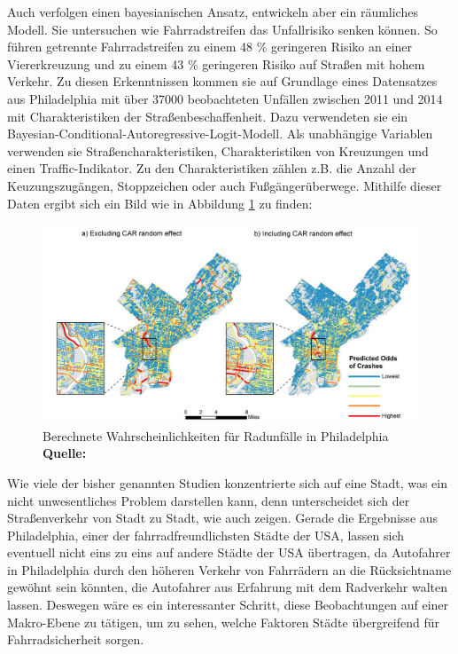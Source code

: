 \documentclass[a4paper,12pt]{thesis}
\newcommand*{\captionsource}[2]{%
	\caption[{#1}]{%
		#1%
		\\\hspace{\linewidth}%
		\textbf{Quelle:} #2%
	}%
}
\begin{document}
Auch \cite{Kondo2018} verfolgen einen bayesianischen Ansatz, entwickeln aber ein räumliches Modell. Sie untersuchen wie Fahrradstreifen das Unfallrisiko senken können. So führen getrennte Fahrradstreifen zu einem 48 \% geringeren Risiko an einer Viererkreuzung und zu einem 43 \% geringeren Risiko auf Straßen mit hohem Verkehr. Zu diesen Erkenntnissen kommen sie auf Grundlage eines Datensatzes aus Philadelphia mit über 37000 beobachteten Unfällen zwischen 2011 und 2014 mit Charakteristiken der Straßenbeschaffenheit. Dazu verwendeten sie ein Bayesian-Conditional-Autoregressive-Logit-Modell. Als unabhängige Variablen verwenden sie Straßencharakteristiken, Charakteristiken von Kreuzungen und einen Traffic-Indikator. Zu den Charakteristiken zählen z.B. die Anzahl der Keuzungszugängen, Stoppzeichen oder auch Fußgängerüberwege. Mithilfe dieser Daten ergibt sich ein Bild wie in Abbildung \ref{kondor} zu finden:
\begin{figure}[!ht]
	\centering
	\includegraphics[width=\textwidth]{Plots/Kondor.png}
	\captionsource{Berechnete Wahrscheinlichkeiten für Radunfälle in Philadelphia}{
		\cite{Kondo2018}
	}
	\label{kondor}
\end{figure}
Wie viele der bisher genannten Studien konzentrierte sich \cite{Kondo2018} auf eine Stadt, was ein nicht unwesentliches Problem darstellen kann, denn unterscheidet sich der Straßenverkehr von Stadt zu Stadt, wie auch \cite{Goldmann2021} zeigen. Gerade die Ergebnisse aus Philadelphia, einer der fahrradfreundlichsten Städte der USA, lassen sich eventuell nicht eins zu eins auf andere Städte der USA übertragen, da Autofahrer in Philadelphia durch den höheren Verkehr von Fahrrädern an die Rücksichtname gewöhnt sein könnten, die Autofahrer aus Erfahrung mit dem Radverkehr walten lassen. Deswegen wäre es ein interessanter Schritt, diese Beobachtungen auf einer Makro-Ebene zu tätigen, um zu sehen, welche Faktoren Städte übergreifend für Fahrradsicherheit sorgen.\\
\end{document}
